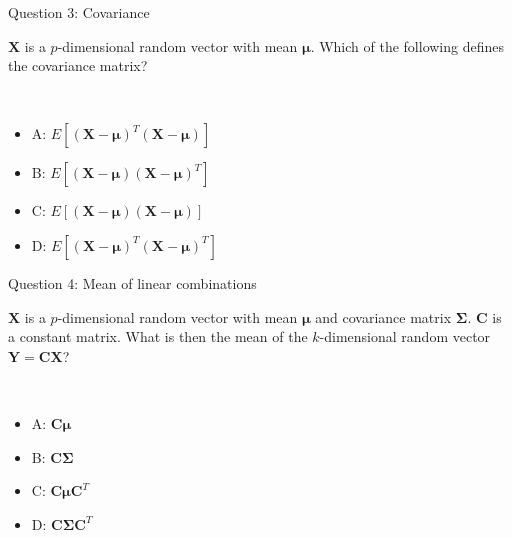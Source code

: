 \documentclass[
  ignorenonframetext,
]{beamer}
\providecommand{\tightlist}{%
  \setlength{\itemsep}{0pt}\setlength{\parskip}{0pt}}
\begin{document}
\begin{frame}
\begin{block}{Question 3: Covariance}
\protect\hypertarget{question-3-covariance}{}
\vspace{2mm}

\(\boldsymbol{X}\) is a \(p\)-dimensional random vector with mean
\(\boldsymbol{\mu}\). Which of the following defines the covariance
matrix?

\(~\)

\begin{itemize}
\tightlist
\item
  A:
  \(E[(\boldsymbol{X}-\boldsymbol{\mu})^T(\boldsymbol{X}-\boldsymbol{\mu})]\)
\item
  B:
  \(E[(\boldsymbol{X}-\boldsymbol{\mu})(\boldsymbol{X}-\boldsymbol{\mu})^T]\)
\item
  C:
  \(E[(\boldsymbol{X}-\boldsymbol{\mu})(\boldsymbol{X}-\boldsymbol{\mu})]\)\\
\item
  D:
  \(E[(\boldsymbol{X}-\boldsymbol{\mu})^T(\boldsymbol{X}-\boldsymbol{\mu})^T]\)
\end{itemize}
\end{block}
\end{frame}

\begin{frame}
\begin{block}{Question 4: Mean of linear combinations}
\protect\hypertarget{question-4-mean-of-linear-combinations}{}
\vspace{2mm}

\(\boldsymbol{X}\) is a \(p\)-dimensional random vector with mean
\(\boldsymbol{\mu}\) and covariance matrix \(\boldsymbol\Sigma\).
\(\boldsymbol{C}\) is a constant matrix. What is then the mean of the
\(k\)-dimensional random vector
\(\boldsymbol{Y}=\boldsymbol{C}\boldsymbol{X}\)?

\(~\)

\begin{itemize}
\tightlist
\item
  A: \(\boldsymbol{C}\boldsymbol{\mu}\)
\item
  B: \(\boldsymbol{C}\boldsymbol\Sigma\)
\item
  C: \(\boldsymbol{C}\boldsymbol{\mu}\boldsymbol{C}^T\)
\item
  D: \(\boldsymbol{C}\boldsymbol\Sigma\boldsymbol{C}^T\)
\end{itemize}
\end{block}
\end{frame}
\end{document}
